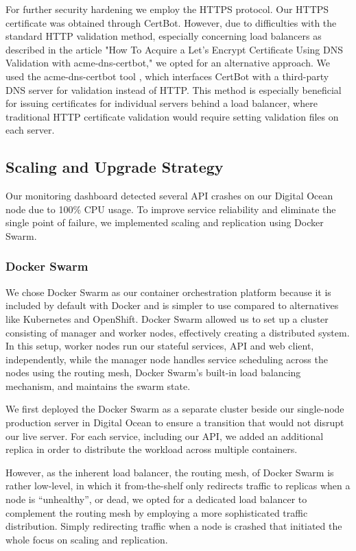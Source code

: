 For further security hardening we employ the HTTPS protocol. Our HTTPS certificate was obtained through CertBot. However, due to difficulties with the standard HTTP validation method, especially concerning load balancers as described in the article "How To Acquire a Let's Encrypt Certificate Using DNS Validation with acme-dns-certbot," \cite{certbotDigitalOceanIssues} we opted for an alternative approach. We used the acme-dns-certbot tool \cite{acmedns}, which interfaces CertBot with a third-party DNS server for validation instead of HTTP. This method is especially beneficial for issuing certificates for individual servers behind a load balancer, where traditional HTTP certificate validation would require setting validation files on each server.

\subsection{Scaling and Upgrade Strategy}
Our monitoring dashboard detected several API crashes on our Digital Ocean node due to 100\% CPU usage. To improve service reliability and eliminate the single point of failure, we implemented scaling and replication using Docker Swarm.

\subsubsection*{Docker Swarm}
We chose Docker Swarm as our container orchestration platform because it is included by default with Docker and is simpler to use compared to alternatives like Kubernetes and OpenShift. Docker Swarm allowed us to set up a cluster consisting of manager and worker nodes, effectively creating a distributed system. In this setup, worker nodes run our stateful services, API and web client, independently, while the manager node handles service scheduling across the nodes using the routing mesh, Docker Swarm's built-in load balancing mechanism, and maintains the swarm state.

We first deployed the Docker Swarm as a separate cluster beside our single-node production server in Digital Ocean to ensure a transition that would not disrupt our live server. For each service, including our API, we added an additional replica in order to distribute the workload across multiple containers.

However, as the inherent load balancer, the routing mesh, of Docker Swarm is rather low-level, in which it from-the-shelf only redirects traffic to replicas when a node is “unhealthy”, or dead, we opted for a dedicated load balancer to complement the routing mesh by employing a more sophisticated traffic distribution. Simply redirecting traffic when a node is crashed  that initiated the whole focus on scaling and replication.

